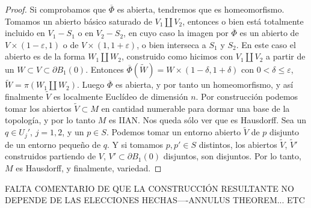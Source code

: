 \documentclass[10pt]{report}
\theoremstyle{definition}
\begin{document}
\begin{proof}
Si comprobamos que $\overline{\Phi}$ es abierta, tendremos que es homeomorfismo. Tomamos un abierto básico saturado de $V_1\amalg V_2$, entonces o bien está totalmente incluido en $V_1-S_1$ o en $V_2-S_2$, en cuyo caso la imagen por $\overline{\Phi}$ es un abierto de $V\times (1-\varepsilon ,1)$ o de $V\times (1,1+\varepsilon )$, o bien interseca a $S_1$ y $S_2$. En este caso el abierto es de la forma $W_1\amalg W_2$, construido como hicimos con $V_1\amalg V_2$ a partir de un $W\subset V \subset \partial B_1(0)$. Entonces $\overline{\Phi} (\tilde{W})= W \times (1-\delta , 1+\delta )$ con $0<\delta \leq \varepsilon$, $\tilde{W} = \pi (W_1 \amalg W_2)$. Luego $\overline{\Phi}$ es abierta, y por tanto un homeomorfismo, y así finalmente $\tilde{V}$ es localmente Euclídeo de dimensión $n$. Por construcción podemos tomar los abiertos $\tilde{V} \subset  M$ en cantidad numerable para dormar una base de la topología, y por lo tanto $M$ es IIAN. Nos queda sólo ver que es Hausdorff. Sea un $q\in U_j'$, $j=1,2$, y  un $p\in S$. Podemos tomar un entorno abierto $\tilde{V}$ de $p$ disjunto de un entorno pequeño de $q$. Y si tomamos $p, p' \in S$ distintos, los abiertos $\tilde{V}$, $\tilde{V}'$ construidos partiendo de $V$, $V'\subset \partial B_1(0)$ disjuntos, son disjuntos. Por lo tanto, $M$ es Hausdorff, y finalmente, variedad.

\end{proof}

FALTA COMENTARIO DE QUE LA CONSTRUCCIÓN RESULTANTE NO DEPENDE DE LAS ELECCIONES HECHAS----ANNULUS THEOREM... ETC

\clearpage
\end{document}
